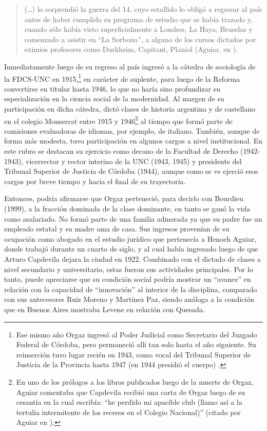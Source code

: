 \begin{quote}
(\dots) lo sorprendió la guerra del 14, cuyo estallido lo obligó a regresar al país antes de haber cumplido su programa de estudio que se había trazado y, cuando sólo había visto superficialmente a Londres, La Haya, Bruselas y comenzado a asistir en \enquote{La Sorbona}, a alguno de los cursos dictados por eximios profesores como Durkheim, Capitant, Planiol (Aguiar, en \cite[10]{1544-ORGAZ1960}).
\end{quote}

Inmediatamente luego de su regreso al país ingresó a la cátedra de sociología de la FDCS-UNC en 1915,\footnote{Ese mismo año Orgaz ingresó al Poder Judicial como Secretario del Juzgado Federal de Córdoba, pero permaneció allí tan solo hasta el año siguiente. Su reinserción tuvo lugar recién en 1943, como vocal del Tribunal Superior de Justicia de la Provincia hasta 1947 (en 1944 presidió el cuerpo) \parencite{1528-REQUENA2010}.} en carácter de suplente, para luego de la Reforma convertirse en titular hasta 1946, lo que no haría sino profundizar su especialización en la ciencia social de la modernidad. Al margen de su participación en dicha cátedra, dictó clases de historia argentina y de castellano en el colegio Monserrat entre 1915 y 1946\footnote{En uno de los prólogos a los libros publicados luego de la muerte de Orgaz, Aguiar comentaba que Capdevila recibió una carta de Orgaz luego de su cesantía en la cual escribía: \enquote{he perdido mi apacible club (llamo así a la tertulia intermitente de los recreos en el Colegio Nacional)} (citado por Aguiar en \cite[20]{1545-ORGAZ1950}).} al tiempo que formó parte de comisiones evaluadoras de idiomas, por ejemplo, de italiano. También, aunque de forma más modesta, tuvo participación en algunos cargos a nivel institucional. En este rubro se destacan su ejercicio como decano de la Facultad de Derecho (1942-1943), vicerrector y rector interino de la UNC (1943, 1945) y presidente del Tribunal Superior de Justicia de Córdoba (1944), aunque como se ve ejerció esos cargos por breve tiempo y hacia el final de su trayectoria.

Entonces, podría afirmarse que Orgaz perteneció, para decirlo con Bourdieu (1999), a la fracción dominada de la clase dominante, en tanto se ganó la vida como asalariado. No formó parte de una familia adinerada ya que su padre fue un empleado estatal y su madre ama de casa. Sus ingresos provenían de su ocupación como abogado en el estudio jurídico que pertenecía a Henoch Aguiar, donde trabajó durante un cuarto de siglo, y al cual había ingresado luego de que Arturo Capdevila dejara la ciudad en 1922. Combinado con el dictado de clases a nivel secundario y universitario, estas fueron sus actividades principales. Por lo tanto, puede apreciarse que su condición social podría mostrar un \enquote{avance} en relación con la capacidad de \enquote{innovación} al interior de la disciplina, comparado con sus antecesores Ruiz Moreno y Martínez Paz, siendo análoga a la condición que en Buenos Aires mostraba Levene en relación con Quesada.

